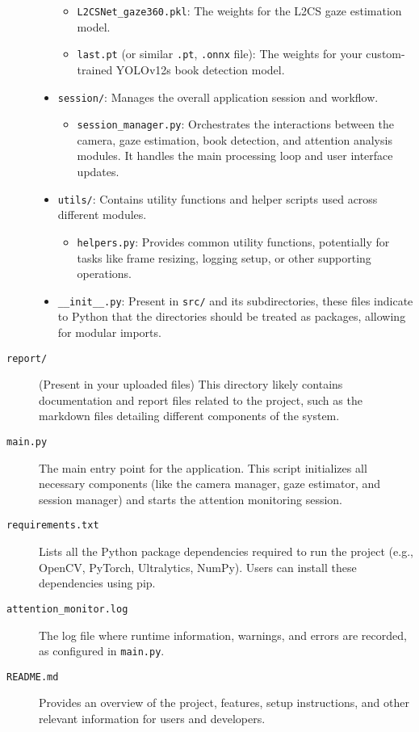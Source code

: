 \begin{description}
\begin{itemize}
        \begin{itemize}
            \item \texttt{L2CSNet\_gaze360.pkl}: The weights for the L2CS gaze estimation model.
            \item \texttt{last.pt} (or similar \texttt{.pt}, \texttt{.onnx} file): The weights for your custom-trained YOLOv12s book detection model.
        \end{itemize}
        \item \texttt{session/}: Manages the overall application session and workflow.
        \begin{itemize}
            \item \texttt{session\_manager.py}: Orchestrates the interactions between the camera, gaze estimation, book detection, and attention analysis modules. It handles the main processing loop and user interface updates.
        \end{itemize}
        \item \texttt{utils/}: Contains utility functions and helper scripts used across different modules.
        \begin{itemize}
            \item \texttt{helpers.py}: Provides common utility functions, potentially for tasks like frame resizing, logging setup, or other supporting operations.
        \end{itemize}
        \item \texttt{\_\_init\_\_.py}: Present in \texttt{src/} and its subdirectories, these files indicate to Python that the directories should be treated as packages, allowing for modular imports.
    \end{itemize}

    \item[\texttt{report/}] (Present in your uploaded files) This directory likely contains documentation and report files related to the project, such as the markdown files detailing different components of the system.

    \item[\texttt{main.py}] The main entry point for the application. This script initializes all necessary components (like the camera manager, gaze estimator, and session manager) and starts the attention monitoring session.

    \item[\texttt{requirements.txt}] Lists all the Python package dependencies required to run the project (e.g., OpenCV, PyTorch, Ultralytics, NumPy). Users can install these dependencies using pip.

    \item[\texttt{attention\_monitor.log}] The log file where runtime information, warnings, and errors are recorded, as configured in \texttt{main.py}.

    \item[\texttt{README.md}] Provides an overview of the project, features, setup instructions, and other relevant information for users and developers.

\end{description}
